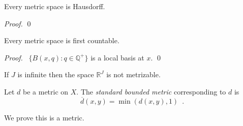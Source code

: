 \begin{lm}
  Every metric space is Hausdorff.
\end{lm}

\begin{proof}
  \pf
  \qed
\end{proof}

\begin{thm}
  Every metric space is first countable.
\end{thm}

\begin{proof}
  \pf\ $\{ B(x, q) : q \in \mathbb{Q}^+ \}$ is a local basis at $x$. \qed
\end{proof}

\begin{cor}
  If $J$ is infinite then the space $\mathbb{R}^J$ is not metrizable.
\end{cor}

\begin{df}
  Let $d$ be a metric on $X$. The \emph{standard bounded metric}
  corresponding to $d$ is
  \[ \overline{d}(x, y) = \min(d(x, y), 1) \enspace . \]

  We prove this is a metric.
\end{df}

